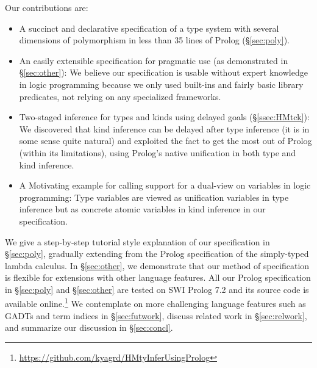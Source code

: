 Our contributions are:
\begin{itemize}\vspace*{-1ex}
\item A succinct and declarative specification of
	a type system with several dimensions of polymorphism
	in less than 35 lines of Prolog (\S\ref{sec:poly}).
\item An easily extensible specification for pragmatic use
	(as demonstrated in \S\ref{sec:other}):
We believe our specification is usable without expert knowledge
in logic programming because we only used built-ins and fairly basic
library predicates, not relying on any specialized frameworks.
\item Two-staged inference for types and kinds using delayed goals
	(\S\ref{ssec:HMtck}):
We discovered that kind inference can be delayed after type inference
(it is in some sense quite natural) and exploited the fact to get the
most out of Prolog (within its limitations), using Prolog's
native unification in both type and kind inference.
\item A Motivating example for calling support for a dual-view
	on variables in logic programming:
Type variables are viewed as unification variables
in type inference but as concrete atomic variables
in kind inference in our specification.
\end{itemize}

We give a step-by-step tutorial style explanation of our specification in
\S\ref{sec:poly}, gradually extending from the Prolog specification of
the simply-typed lambda calculus. In \S\ref{sec:other}, we demonstrate
that our method of specification is flexible for extensions with
other language features. All our Prolog specification in \S\ref{sec:poly}
and \S\ref{sec:other} are tested on SWI Prolog 7.2 and its source code is
available online.\footnote{
	\url{https://github.com/kyagrd/HMtyInferUsingProlog} }
We contemplate on more challenging language features such as GADTs and
term indices in \S\ref{sec:futwork}, discuss related work in
\S\ref{sec:relwork}, and summarize our discussion in \S\ref{sec:concl}.




